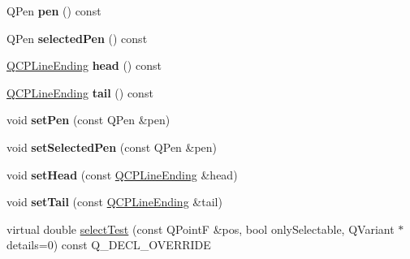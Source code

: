 \begin{DoxyCompactItemize}
\item 
Q\+Pen {\bfseries pen} () const \hypertarget{class_q_c_p_item_line_a235779dd079a263bedb20b3daecc40eb}{}\label{class_q_c_p_item_line_a235779dd079a263bedb20b3daecc40eb}

\item 
Q\+Pen {\bfseries selected\+Pen} () const \hypertarget{class_q_c_p_item_line_a9fde5e95a1a369008252e18f1925650c}{}\label{class_q_c_p_item_line_a9fde5e95a1a369008252e18f1925650c}

\item 
\hyperlink{class_q_c_p_line_ending}{Q\+C\+P\+Line\+Ending} {\bfseries head} () const \hypertarget{class_q_c_p_item_line_a5f6cbc5c763feae9dfbce71748fc43f1}{}\label{class_q_c_p_item_line_a5f6cbc5c763feae9dfbce71748fc43f1}

\item 
\hyperlink{class_q_c_p_line_ending}{Q\+C\+P\+Line\+Ending} {\bfseries tail} () const \hypertarget{class_q_c_p_item_line_a5d2ca0f784933e80f3e6e1d15dceebb3}{}\label{class_q_c_p_item_line_a5d2ca0f784933e80f3e6e1d15dceebb3}

\item 
void {\bfseries set\+Pen} (const Q\+Pen \&pen)\hypertarget{class_q_c_p_item_line_a572528dab61c1abe205822fbd5db4b27}{}\label{class_q_c_p_item_line_a572528dab61c1abe205822fbd5db4b27}

\item 
void {\bfseries set\+Selected\+Pen} (const Q\+Pen \&pen)\hypertarget{class_q_c_p_item_line_a3e2fec44503277e77717e9c24f87f1ea}{}\label{class_q_c_p_item_line_a3e2fec44503277e77717e9c24f87f1ea}

\item 
void {\bfseries set\+Head} (const \hyperlink{class_q_c_p_line_ending}{Q\+C\+P\+Line\+Ending} \&head)\hypertarget{class_q_c_p_item_line_aebf3d687114d584e0459db6759e2c3c3}{}\label{class_q_c_p_item_line_aebf3d687114d584e0459db6759e2c3c3}

\item 
void {\bfseries set\+Tail} (const \hyperlink{class_q_c_p_line_ending}{Q\+C\+P\+Line\+Ending} \&tail)\hypertarget{class_q_c_p_item_line_ac264222c3297a7efe33df9345c811a5f}{}\label{class_q_c_p_item_line_ac264222c3297a7efe33df9345c811a5f}

\item 
virtual double \hyperlink{class_q_c_p_item_line_a6ab9156f12d5f4cf23bf24121c2bf97c}{select\+Test} (const Q\+PointF \&pos, bool only\+Selectable, Q\+Variant $\ast$details=0) const Q\+\_\+\+D\+E\+C\+L\+\_\+\+O\+V\+E\+R\+R\+I\+DE
\end{DoxyCompactItemize}
